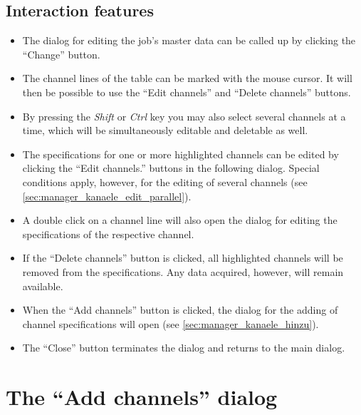 \documentclass[a4paper,12pt,BCOR6mm,bibtotoc,idxtotoc]{scrbook}
\begin{document}

\subsection{Interaction features}

\begin{itemize}

\item The dialog for editing the job’s master data can be called up by
clicking the ``Change'' button.

\item The channel lines of the table can be marked with the mouse cursor. It
will then be possible to use the ``Edit channels'' and ``Delete channels''
buttons.

\item By pressing the \textit{Shift} or \textit{Ctrl} key you may also select
several channels at a time, which will be simultaneously editable and
deletable as well.

\item The specifications for one or more highlighted channels can be edited by
clicking the ``Edit channels.'' buttons in the following dialog. Special
conditions apply, however, for the editing of several channels (see
\autoref{sec:manager_kanaele_edit_parallel}).

\item A double click on a channel line will also open the dialog for editing
the specifications of the respective channel.

\item If the ``Delete channels'' button is clicked, all highlighted
channels will be removed from the specifications. Any data acquired,
however, will remain available.

\item When the ``Add channels'' button is clicked, the dialog for the adding
of channel specifications will open (see \autoref{sec:manager_kanaele_hinzu}).

\item The ``Close'' button terminates the dialog and returns to the main
dialog.

\end{itemize}


\section{The ``Add channels'' dialog} \label{sec:manager_kanaele_hinzu}
\end{document}
